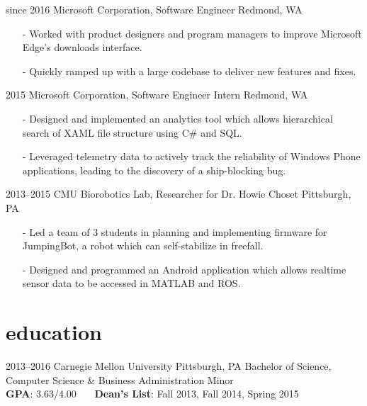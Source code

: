 \documentclass[print]{template/friggeri-cv}
\begin{document}
    \begin{entrylist}
        \entrys
            {since 2016}
            {Microsoft Corporation, {\normalfont Software Engineer}}
            {Redmond, WA}
            {\begin{itemize}[leftmargin=*]
                \item[-] Worked with product designers and program managers to improve Microsoft Edge's downloads interface.
                \item[-] Quickly ramped up with a large codebase to deliver new features and fixes.
             \end{itemize}}
        \entrys
            {2015}
            {Microsoft Corporation, {\normalfont Software Engineer Intern}}
            {Redmond, WA}
            {\begin{itemize}[leftmargin=*]
                \item[-] Designed and implemented an analytics tool which allows hierarchical search of XAML file structure using C\# and SQL.
                \item[-] Leveraged telemetry data to actively track the reliability of Windows Phone applications, leading to the discovery of a ship-blocking bug.
             \end{itemize}}
        \entrys
            {2013--2015}
            {CMU Biorobotics Lab, {\normalfont Researcher for Dr. Howie Choset}}
            {Pittsburgh, PA}
            {\begin{itemize}[leftmargin=*]
                \item[-] Led a team of 3 students in planning and implementing firmware for JumpingBot, a robot which can self-stabilize in freefall.
                \item[-] Designed and programmed an Android application which allows realtime sensor data to be accessed in MATLAB and ROS.
            \end{itemize}}
    \end{entrylist}

    \section{education}

    \begin{entrylist}
        \entry
            {2013--2016}
            {Carnegie Mellon University}
            {Pittsburgh, PA}
            {Bachelor of Science, Computer Science \& Business Administration Minor\\
            \textbf{GPA}: 3.63/4.00 \ \ \ \textbf{Dean's List}: Fall 2013, Fall 2014, Spring 2015}
    \end{entrylist}
\end{document}
